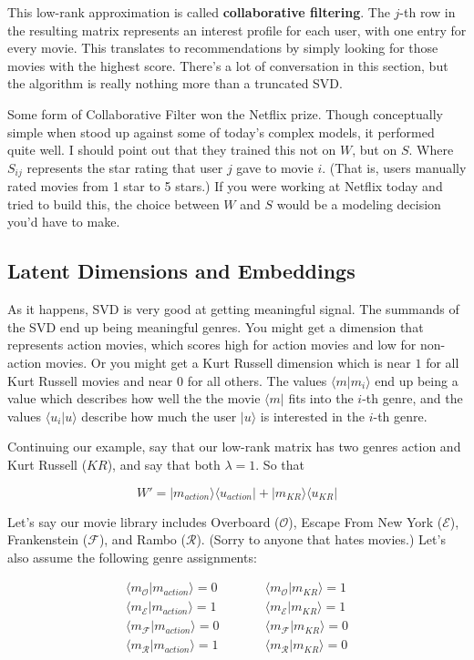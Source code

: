 \documentclass{amsbook}
\begin{document}
This low-rank approximation is called {\bf collaborative filtering}.  The $j$-th row in the resulting matrix represents an interest profile for each user, with one entry for every movie.  This translates to recommendations by simply looking for those movies with the highest score.  There's a lot of conversation in this section, but the algorithm is really nothing more than a truncated SVD.

Some form of Collaborative Filter won the Netflix prize.  Though conceptually simple when stood up against some of today's complex models, it performed quite well.  I should point out that they trained this not on $W$, but on $S$.  Where $S_{ij}$ represents the star rating that user $j$ gave to movie $i$.  (That is, users manually rated movies from 1 star to 5 stars.)  If you were working at Netflix today and tried to build this, the choice between $W$ and $S$ would be a modeling decision you'd have to make.

\subsection{Latent Dimensions and Embeddings}

As it happens, SVD is very good at getting meaningful signal.  The summands of the SVD end up being meaningful genres.  You might get a dimension that represents action movies, which scores high for action movies and low for non-action movies.  Or you might get a Kurt Russell dimension which is near $1$ for all Kurt Russell movies and near $0$ for all others.  The values $\langle m|m_i\rangle$ end up being a value which describes how well the the movie $\langle m|$ fits into the $i$-th genre, and the values $\langle u_i|u\rangle$ describe how much the user $|u\rangle$ is interested in the $i$-th genre.

Continuing our example, say that our low-rank matrix has two genres action and Kurt Russell ($KR$), and say that both $\lambda=1$.  So that

$$
W'=|m_{action}\rangle\langle u_{action}|+|m_{KR}\rangle\langle u_{KR}|
$$

Let's say our movie library includes Overboard ($\mathcal O$), Escape From New York ($\mathcal E$), Frankenstein ($\mathcal F$), and Rambo ($\mathcal R$).  (Sorry to anyone that hates movies.)  Let's also assume the following genre assignments:

$$
\begin{array}{lll}
\langle m_{\mathcal O}|m_{action}\rangle=0&\quad\quad&\langle m_{\mathcal O}|m_{KR}\rangle=1 \\
\langle m_{\mathcal E}|m_{action}\rangle=1&\quad\quad&\langle m_{\mathcal E}|m_{KR}\rangle=1 \\
\langle m_{\mathcal F}|m_{action}\rangle=0&\quad\quad&\langle m_{\mathcal F}|m_{KR}\rangle=0 \\
\langle m_{\mathcal R}|m_{action}\rangle=1&\quad\quad&\langle m_{\mathcal R}|m_{KR}\rangle=0
\end{array}
$$
\end{document}
